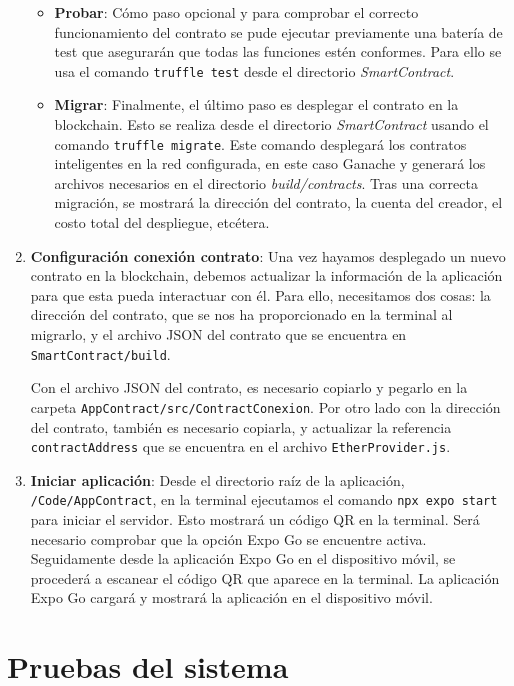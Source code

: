 \begin{enumerate}
	\begin{itemize}
	\item \textbf{Probar}: Cómo paso opcional y para comprobar el correcto funcionamiento del contrato se 
	pude ejecutar previamente una batería de test que asegurarán que todas las funciones estén conformes.
	Para ello se usa el comando \texttt{truffle test} desde el directorio \textit{SmartContract}.
	
	\end{itemize}
	
	\begin{itemize}
	\item \textbf{Migrar}: Finalmente, el último paso es desplegar el contrato en la blockchain.
	Esto se realiza desde el directorio \textit{SmartContract} usando el comando \texttt{truffle migrate}.
	Este comando desplegará los contratos inteligentes en la red configurada, en este caso Ganache y generará
	los archivos necesarios en el directorio \textit{build/contracts}.
	Tras una correcta migración, se mostrará la dirección del contrato, la cuenta del creador, el costo total
	del despliegue, etcétera. 
	
	\end{itemize}
	
	
\item \textbf{Configuración conexión contrato}: Una vez hayamos desplegado un nuevo contrato en la blockchain, debemos actualizar la información de la aplicación para que esta pueda interactuar con él.
Para ello, necesitamos dos cosas: la dirección del contrato, que se nos ha proporcionado en la terminal al migrarlo, y el archivo JSON del contrato que se encuentra en \texttt{SmartContract/build}.
	
Con el archivo JSON del contrato, es necesario copiarlo y pegarlo en la carpeta \texttt{AppContract/src/ContractConexion}. 
Por otro lado con la dirección del contrato, también es necesario copiarla, y actualizar la referencia \texttt{contractAddress} que se encuentra en el archivo \texttt{EtherProvider.js}.
	

\item \textbf{Iniciar aplicación}: Desde el directorio raíz de la aplicación, \texttt{/Code/AppContract}, en la terminal ejecutamos el comando \texttt{npx expo start} para iniciar el servidor. Esto mostrará un código QR en la terminal. Será necesario comprobar que la opción Expo Go se encuentre activa.
Seguidamente desde la aplicación Expo Go en el dispositivo móvil, se procederá a escanear el código QR que aparece en la terminal.
La aplicación Expo Go cargará y mostrará la aplicación en el dispositivo móvil.

\end{enumerate}

\section{Pruebas del sistema}
